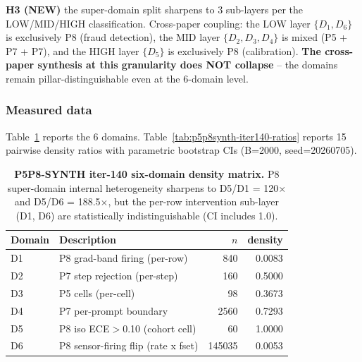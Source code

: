 \documentclass{article}
\begin{document}
\textbf{H3 (NEW)} the super-domain split sharpens to 3 sub-layers per
the LOW/MID/HIGH classification.  Cross-paper coupling: the LOW layer
$\{D_1, D_6\}$ is exclusively P8 (fraud detection), the MID layer
$\{D_2, D_3, D_4\}$ is mixed (P5 + P7 + P7), and the HIGH layer $\{D_5\}$
is exclusively P8 (calibration).  \textbf{The cross-paper synthesis at
this granularity does NOT collapse} -- the domains remain
pillar-distinguishable even at the 6-domain level.

\subsubsection{Measured data}
Table~\ref{tab:p5p8synth-iter140-six-domain} reports the 6 domains.
Table~\ref{tab:p5p8synth-iter140-ratios} reports 15 pairwise density
ratios with parametric bootstrap CIs (B=2000, seed=20260705).

\begin{table}[h]
\centering
\caption{\textbf{P5P8-SYNTH iter-140 six-domain density matrix.}
P8 super-domain internal heterogeneity sharpens to
D5/D1 = 120$\times$ and D5/D6 = 188.5$\times$, but the per-row
intervention sub-layer (D1, D6) are statistically indistinguishable
(CI includes 1.0).}
\label{tab:p5p8synth-iter140-six-domain}
\small
\begin{tabular}{llrr}
\toprule
Domain & Description & $n$ & density \\
\midrule
D1 & P8 grad-band firing (per-row) & 840 & 0.0083 \\
D2 & P7 step rejection (per-step)  & 160 & 0.5000 \\
D3 & P5 cells (per-cell)           & 98  & 0.3673 \\
D4 & P7 per-prompt boundary        & 2560 & 0.7293 \\
D5 & P8 iso ECE$>$0.10 (cohort cell) & 60 & 1.0000 \\
D6 & P8 sensor-firing flip (rate x fset) & 145035 & 0.0053 \\
\bottomrule
\end{tabular}
\end{table}
\end{document}
